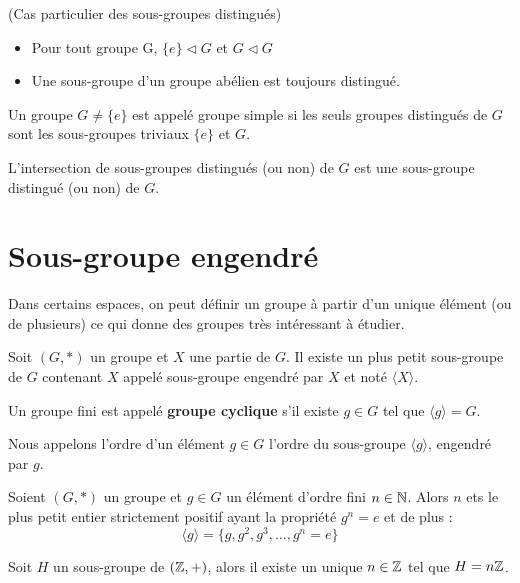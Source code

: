 \begin{remark}(Cas particulier des sous-groupes distingués)
    \begin{itemize}
        \item Pour tout groupe G, $\{ e \} \triangleleft G$ et $G  \triangleleft G$
        \item Une sous-groupe d'un groupe abélien est toujours distingué. 
    \end{itemize}
\end{remark}

\begin{definition}
    Un groupe $G \not = \{ e \}$ est appelé groupe simple si les seuls groupes distingués de $G$ sont les sous-groupes triviaux $\{ e \}$ et $G$.
\end{definition}

\begin{proposition}
    L'intersection de sous-groupes distingués (ou non) de $G$ est une sous-groupe distingué (ou non) de $G$.
\end{proposition}

\newpage


\section{Sous-groupe engendré}

Dans certains espaces, on peut définir un groupe à partir d'un unique élément (ou de plusieurs) ce qui donne des 
groupes très intéressant à étudier. 

\begin{definition}
    Soit $(G,*)$ un groupe et $X$ une partie de $G$. Il existe un plus petit sous-groupe de $G$ contenant $X$ appelé sous-groupe engendré par $X$ et noté $\langle X\rangle $.

    Un groupe fini est appelé \textbf{groupe cyclique} s'il existe $g \in G$ tel que $\langle g\rangle =G$.

    Nous appelons l'ordre d'un élément $g \in G$ l'ordre du sous-groupe $\langle g\rangle $, engendré par $g$.
\end{definition}

\begin{corollary}
    Soient $(G,*)$ un groupe et $g \in G$ un élément d'ordre fini $n \in \mathbb{N}$. Alors $n$ ets le plus petit entier strictement positif ayant la propriété $g^n = e$ et de plus : 
        \[ \langle g\rangle  = \{ g, g^2, g^3, \dots, g^n=e \} \] 
\end{corollary}

\begin{proposition}
    Soit $H$ un sous-groupe de $(\mathbb{Z},+)$, alors il existe un unique $n \in \mathbb{Z}$ tel que $ H = n\mathbb{Z}$.
\end{proposition}
